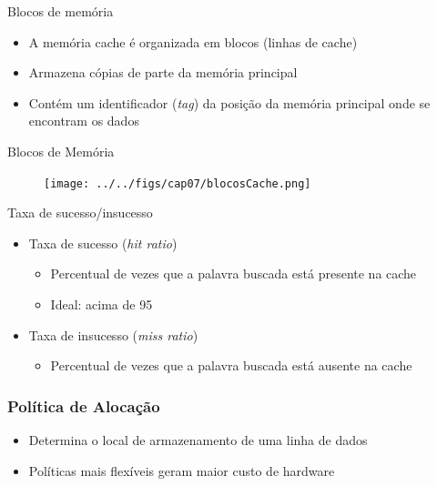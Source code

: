 \documentclass[aspectratio=169,
				xcolor=table]{beamer}
\begin{document}
	\begin{frame}{Blocos de memória}
		\begin{itemize}
			\item A memória cache é organizada em blocos (linhas de cache)
			\vspace{1em}
			\item Armazena cópias de parte da memória principal
			\vspace{1em}
			\item Contém um identificador (\textit{tag}) da posição da memória principal onde se encontram os dados
		\end{itemize}
	\end{frame}	

	\begin{frame}{Blocos de Memória}

		\begin{figure}[hbtp]
			\centering
			\texttt{[image: ../../figs/cap07/blocosCache.png]}
		\end{figure}		
	\end{frame}
	
	\begin{frame}{Taxa de sucesso/insucesso}

		\begin{itemize}
			\item Taxa de sucesso (\textit{hit ratio})
			\begin{itemize}
				\item Percentual de vezes que a palavra buscada está presente na cache
				\item Ideal: acima de 95%
			\end{itemize}			
			\vspace{1em}
			\item Taxa de insucesso (\textit{miss ratio})
			\begin{itemize}
				\item Percentual de vezes que a palavra buscada está ausente na cache				
			\end{itemize}
		\end{itemize}	
	
	\end{frame}
	
	\begin{frame}
		\frametitle{Política de Alocação}
		\begin{itemize}
			\item Determina o local de armazenamento de uma linha de dados
			\vspace{1em}
			\item Políticas mais flexíveis geram maior custo de hardware
		\end{itemize}
	\end{frame}
	
\end{document}
